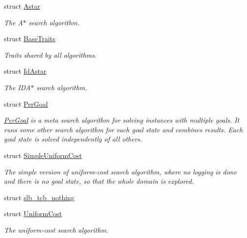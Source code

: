 \begin{DoxyCompactItemize}
struct \hyperlink{structslb_1_1ext_1_1algorithm_1_1Astar}{Astar}
\begin{DoxyCompactList}\small\item\em The {\ttfamily A$\ast$} search algorithm. \end{DoxyCompactList}\item 
struct \hyperlink{structslb_1_1ext_1_1algorithm_1_1BaseTraits}{Base\+Traits}
\begin{DoxyCompactList}\small\item\em Traits shared by all algorithms. \end{DoxyCompactList}\item 
struct \hyperlink{structslb_1_1ext_1_1algorithm_1_1IdAstar}{Id\+Astar}
\begin{DoxyCompactList}\small\item\em The {\ttfamily I\+D\+A$\ast$} search algorithm. \end{DoxyCompactList}\item 
struct \hyperlink{structslb_1_1ext_1_1algorithm_1_1PerGoal}{Per\+Goal}
\begin{DoxyCompactList}\small\item\em {\ttfamily \hyperlink{structslb_1_1ext_1_1algorithm_1_1PerGoal}{Per\+Goal}} is a meta search algorithm for solving instances with multiple goals. It runs some other search algorithm for each goal state and combines results. Each goal state is solved independently of all others. \end{DoxyCompactList}\item 
struct \hyperlink{structslb_1_1ext_1_1algorithm_1_1SimpleUniformCost}{Simple\+Uniform\+Cost}
\begin{DoxyCompactList}\small\item\em The simple version of uniform-\/cost search algorithm, where no logging is done and there is no goal state, so that the whole domain is explored. \end{DoxyCompactList}\item 
struct \hyperlink{structslb_1_1ext_1_1algorithm_1_1slb__tcb__nothing}{slb\+\_\+tcb\+\_\+nothing}
\item 
struct \hyperlink{structslb_1_1ext_1_1algorithm_1_1UniformCost}{Uniform\+Cost}
\begin{DoxyCompactList}\small\item\em The uniform-\/cost search algorithm. \end{DoxyCompactList}\end{DoxyCompactItemize}
